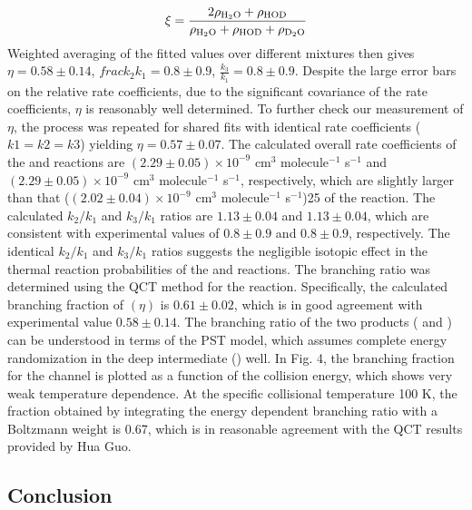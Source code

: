 \begin{equation}
	\xi = \frac{2 \rho_{\ce{H2O}} + \rho_{\ce{HOD}}}{\rho_{\ce{H2O}} + \rho_{\ce{HOD}} + \rho_{\ce{D2O}}}
\end{equation}
Weighted averaging of the fitted values over different mixtures then gives $\eta = 0.58 \pm 0.14$, $frac{k_2}{k_1} = 0.8 \pm 0.9$, $\frac{k_3}{k_1} = 0.8 \pm 0.9$. Despite the large error bars on the relative rate coefficients, due to the significant covariance of the rate coefficients, $\eta$ is reasonably well determined. To further check our measurement of $\eta$, the process was repeated for shared fits with identical rate coefficients ($k1 = k2 = k3$) yielding $\eta = 0.57 \pm 0.07$. The calculated overall rate coefficients of the  and  reactions are $(2.29 \pm 0.05) \times 10^{-9}$ cm$^3$ molecule$^{-1}$ s$^{-1}$ and $(2.29 \pm 0.05) \times 10^{-9}$ cm$^3$ molecule$^{-1}$ s$^{-1}$, respectively, which are slightly larger than that ($(2.02 \pm 0.04) \times 10^{-9}$ cm$^3$ molecule$^{-1}$ s$^{-1}$)25 of the  reaction. The calculated $k_2/k_1$ and $k_3/k_1$ ratios are $1.13 \pm 0.04$ and $1.13 \pm 0.04$, which are consistent with experimental values of $0.8 \pm 0.9$ and $0.8 \pm 0.9$, respectively. The identical $k_2/k_1$ and $k_3/k_1$ ratios suggests the negligible isotopic effect in the thermal reaction probabilities of the  and  reactions. The branching ratio was determined using the QCT method for the  reaction. Specifically, the calculated branching fraction of  $(\eta)$ is $0.61 \pm 0.02$, which is in good agreement with experimental value $0.58 \pm 0.14$. The branching ratio of the two products ( and ) can be understood in terms of the PST model, which assumes complete energy randomization in the deep intermediate () well. In Fig. 4, the branching fraction for the  channel is plotted as a function of the collision energy, which shows very weak temperature dependence. At the specific collisional temperature 100 K, the fraction obtained by integrating the energy dependent branching ratio with a Boltzmann weight is 0.67, which is in reasonable agreement with the QCT results provided by Hua Guo.\cite{Chen2018}

\subsection{Conclusion}

